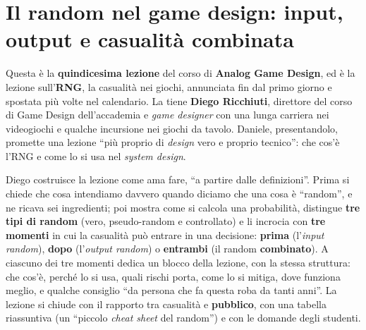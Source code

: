 %
%
%    
%    
%

\chapter[Il random nel game design]{Il random nel game design: input, output e casualità
combinata}
\label{a15:cap:random}

Questa è la \textbf{quindicesima lezione} del corso di \textbf{Analog Game Design}, ed è
la lezione sull'\textbf{RNG}, la casualità nei giochi, annunciata fin dal primo giorno e
spostata più volte nel calendario. La tiene \textbf{Diego Ricchiuti}, direttore del corso
di Game Design dell'accademia e \emph{game designer} con una lunga carriera nei videogiochi
e qualche incursione nei giochi da tavolo. Daniele, presentandolo, promette una lezione
``più proprio di \emph{design} vero e proprio tecnico'': che cos'è l'RNG e come lo si usa
nel \emph{system design}.

Diego costruisce la lezione come ama fare, ``a partire dalle definizioni''. Prima si chiede
che cosa intendiamo davvero quando diciamo che una cosa è ``random'', e ne ricava sei
ingredienti; poi mostra come si calcola una probabilità, distingue \textbf{tre tipi di
random} (vero, pseudo-random e controllato) e li incrocia con \textbf{tre momenti} in cui la
casualità può entrare in una decisione: \textbf{prima} (l'\emph{input random}),
\textbf{dopo} (l'\emph{output random}) o \textbf{entrambi} (il random \textbf{combinato}).
A ciascuno dei tre momenti dedica un blocco della lezione, con la stessa struttura: che
cos'è, perché lo si usa, quali rischi porta, come lo si mitiga, dove funziona meglio, e
qualche consiglio ``da persona che fa questa roba da tanti anni''. La lezione si chiude con
il rapporto tra casualità e \textbf{pubblico}, con una tabella riassuntiva (un ``piccolo
\emph{cheat sheet} del random'') e con le domande degli studenti.


